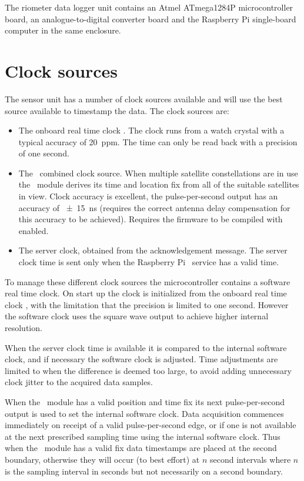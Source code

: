 The riometer data logger unit contains an Atmel ATmega1284P microcontroller
board, an analogue-to-digital converter board and the Raspberry Pi single-board
computer in the same enclosure.

\section{Clock sources}

The sensor unit has a number of clock sources available and will use
the best source available to timestamp the data. The clock
sources are:
\begin{itemize}
\item The onboard real time clock \ic. The clock runs from a
   watch crystal with a typical accuracy of
  \SI{20}{ppm}. The time can only be read back with a precision of one
  second.
\item The \gnss\ combined clock source. When multiple satellite
  constellations are in use the \gnss\ module derives its time and
  location fix from all of the suitable satellites in view. Clock
  accuracy is excellent, the pulse-per-second output has an accuracy
  of \SI{\pm15}{\nano\second} (requires the correct antenna delay
  compensation for this accuracy to be achieved). Requires the
  firmware to be compiled with  enabled.
\item The server clock, obtained from the acknowledgement message. The
  server clock time is sent only when the Raspberry Pi \ntp\ service
  has a valid time.
\end{itemize}

To manage these different clock sources the microcontroller contains a
software real time clock. On start up the clock is initialized from
the onboard real time clock \ic, with the limitation that the
precision is limited to one second. However the software clock uses
the  square wave output to achieve higher internal
resolution.

When the server clock time is available it is compared to the internal
software clock, and if necessary the software clock is adjusted. Time
adjustments are limited to when the difference is deemed too large, to
avoid adding unnecessary clock jitter to the acquired data samples.

When the \gnss\ module has a valid position and time fix its next
pulse-per-second output is used to set the internal software
clock. Data acquisition commences immediately on receipt of a valid
pulse-per-second edge, or if one is not available at the next
prescribed sampling time using the internal software clock. Thus when
the \gnss\ module has a valid fix data timestamps are placed at the
second boundary, otherwise they will occur (to best effort) at $n$
second intervals where $n$ is the sampling interval in seconds but not
necessarily on a second boundary.

